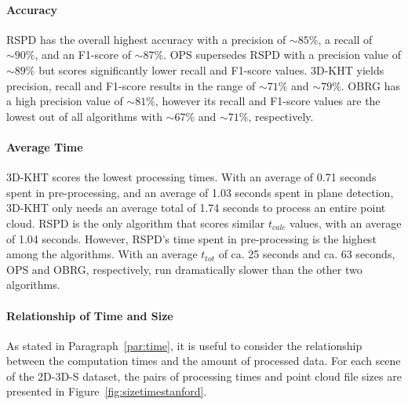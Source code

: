 \documentclass[main.tex]{subfiles}
\begin{document}
\paragraph{Accuracy}
RSPD has the overall highest accuracy with a precision of ${\sim}85\%$, a recall of ${\sim}90\%$, and an F1-score of ${\sim}87\%$.
OPS supersedes RSPD with a precision value of ${\sim}89\%$ but scores significantly lower recall and F1-score values.
3D-KHT yields precision, recall and F1-score results in the range of ${\sim}71\%$ and ${\sim}79\%$.
OBRG has a high precision value of ${\sim}81\%$, however its recall and F1-score values are the lowest out of all algorithms
with ${\sim}67\%$ and ${\sim}71\%$, respectively.

\paragraph{Average Time }
\label{par:2D-3D-S-time}
3D-KHT scores the lowest processing times. With an average of 0.71 seconds spent in pre-processing, and an average of 1.03 seconds spent in plane detection,
3D-KHT only needs an average total of 1.74 seconds to process an entire point cloud. RSPD is the only algorithm that scores similar $t_{calc}$ values, with an
average of 1.04 seconds. However, RSPD's time spent in pre-processing is the highest among the algorithms.
With an average $t_{tot}$ of ca. 25 seconds and ca. 63 seconds, OPS and OBRG, respectively, run dramatically slower than the other two algorithms.

\paragraph{Relationship of Time and Size}
As stated in Paragraph~\ref{par:time}, it is useful to consider the relationship between the computation times and the amount of
processed data. For each scene of the 2D-3D-S dataset, the pairs of
processing times and point cloud file sizes are presented in Figure~\ref{fig:sizetimestanford}.
\end{document}
